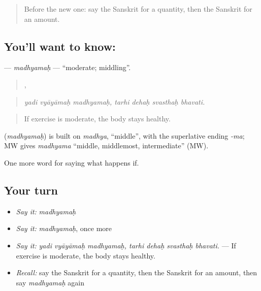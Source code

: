 \label{lesson:SA-C380-madhyamah}



\begin{quote}
Before the new one: say the Sanskrit for a quantity, then the Sanskrit for an amount.
\end{quote}

\subsection*{You'll want to know: }
\textbf{} — \emph{madhyamaḥ} — \textquotedblleft{}moderate; middling\textquotedblright{}.

\begin{quote}
  ,    
\end{quote}

\begin{quote}
\emph{yadi vyāyāmaḥ madhyamaḥ, tarhi dehaḥ svasthaḥ bhavati.}
\end{quote}

\begin{quote}
If exercise is moderate, the body stays healthy.
\end{quote}

\begin{cousinweb}
\textbf{} (\emph{madhyamaḥ}) is built on \emph{madhya}, \textquotedblleft{}middle\textquotedblright{}, with the superlative ending \emph{-ma}; MW gives \emph{madhyama} \textquotedblleft{}middle, middlemost, intermediate\textquotedblright{} (MW).
\end{cousinweb}

\begin{grammarlens}[title={What you've built}]
One more word for saying what happens if.
\end{grammarlens}

\subsection*{Your turn}
\begin{itemize}
\raggedright
  \item \emph{Say it:} \emph{madhyamaḥ}
  \item \emph{Say it:} \emph{madhyamaḥ}, once more
  \item \emph{Say it:} \emph{yadi vyāyāmaḥ madhyamaḥ, tarhi dehaḥ svasthaḥ bhavati.} — If exercise is moderate, the body stays healthy.
  \item \emph{Recall:} say the Sanskrit for a quantity, then the Sanskrit for an amount, then say \emph{madhyamaḥ} again
\end{itemize}

